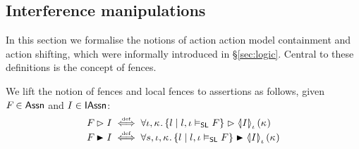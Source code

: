 %	
%
%
%
%
\subsection{Interference manipulations}\label{subsec:extension}
In this section we formalise the notions of action action model containment and action shifting, which were informally introduced in \S\ref{sec:logic}. Central to these definitions is the concept of fences.

We lift the notion of fences and local fences to
assertions as follows, given $F_{} \in \textsf{Assn}$ and $I \in
\textsf{IAssn}$:
\begin{align*}
  \fenceAss{} \fences I &\iffdef \for{\lenv,\ca{}}
  \{ l \mid l, \lenv \slsat F \} \fences \semI[\lenv]{I}(\ca{})\\
  \fenceAss{} \strictfences I &\iffdef \for{s,\lenv,\ca{}}
  \{ l \mid l, \lenv \slsat F \} \strictfences \semI[\lenv]{I}(\ca{})
\end{align*}


